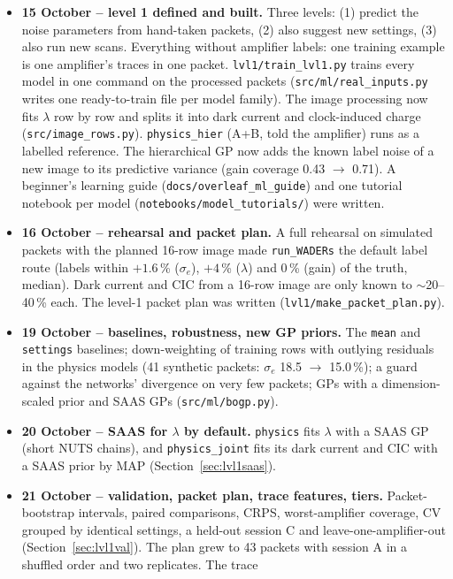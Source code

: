 \documentclass[10pt]{article}
\newcommand{\code}[1]{\texttt{#1}}
\begin{document}
\begin{itemize}
\item \textbf{15 October -- level 1 defined and built.} Three levels: (1) predict the noise parameters from hand-taken packets,
  (2) also suggest new settings, (3) also run new scans. Everything without amplifier labels: one training example is one
  amplifier's traces in one packet. \code{lvl1/train\_lvl1.py} trains every model in one command on the processed packets
  (\code{src/ml/real\_inputs.py} writes one ready-to-train file per model family). The image processing now fits $\lambda$ row by
  row and splits it into dark current and clock-induced charge (\code{src/image\_rows.py}). \code{physics\_hier} (A+B, told the
  amplifier) runs as a labelled reference. The hierarchical GP now adds the known label noise of a new image to its predictive
  variance (gain coverage 0.43 $\to$ 0.71). A beginner's learning guide (\code{docs/overleaf\_ml\_guide}) and one tutorial notebook
  per model (\code{notebooks/model\_tutorials/}) were written.
\item \textbf{16 October -- rehearsal and packet plan.} A full rehearsal on simulated packets with the planned 16-row image made
  \code{run\_WADERs} the default label route (labels within $+1.6$\,\% ($\sigma_e$), $+4$\,\% ($\lambda$) and 0\,\% (gain) of the truth,
  median). Dark current and CIC from a 16-row image are only known to $\sim$20--40\,\% each. The level-1 packet plan was written
  (\code{lvl1/make\_packet\_plan.py}).
\item \textbf{19 October -- baselines, robustness, new GP priors.} The \code{mean} and \code{settings} baselines; down-weighting of
  training rows with outlying residuals in the physics models (41 synthetic packets: $\sigma_e$ 18.5 $\to$ 15.0\,\%); a guard
  against the networks' divergence on very few packets; GPs with a dimension-scaled prior and SAAS GPs (\code{src/ml/bogp.py}).
\item \textbf{20 October -- SAAS for $\lambda$ by default.} \code{physics} fits $\lambda$ with a SAAS GP (short NUTS chains), and
  \code{physics\_joint} fits its dark current and CIC with a SAAS prior by MAP (Section~\ref{sec:lvl1saas}).
\item \textbf{21 October -- validation, packet plan, trace features, tiers.} Packet-bootstrap intervals, paired comparisons, CRPS,
  worst-amplifier coverage, CV grouped by identical settings, a held-out session C and leave-one-amplifier-out
  (Section~\ref{sec:lvl1val}). The plan grew to 43 packets with session A in a shuffled order and two replicates. The trace

\end{itemize}
\end{document}
